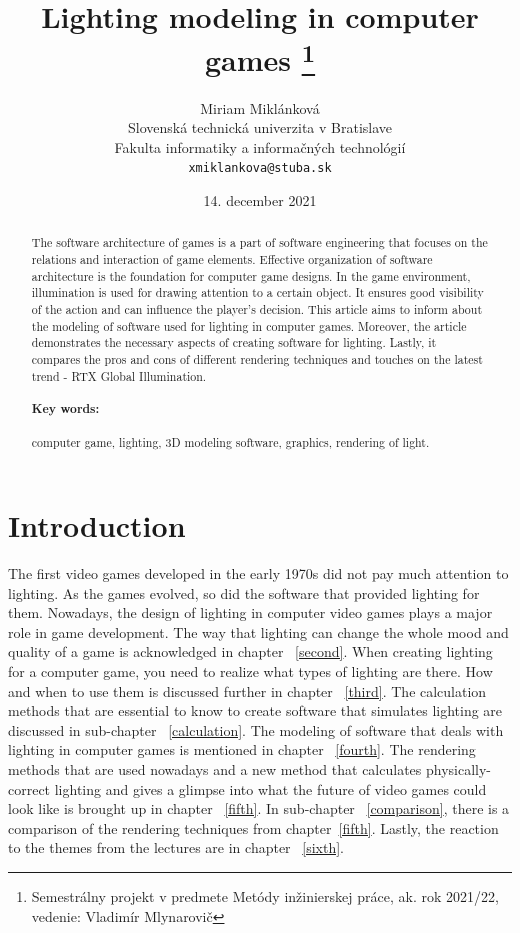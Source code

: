 \documentclass[10pt,twoside,english,a4paper]{article}
\title{Lighting modeling in computer games
\thanks{Semestrálny projekt v predmete Metódy inžinierskej práce, ak. rok 2021/22, vedenie: Vladimír Mlynarovič}}
\author{Miriam Miklánková\\[2pt]
	{\small Slovenská technická univerzita v Bratislave}\\
	{\small Fakulta informatiky a informačných technológií}\\
	{\small \texttt{xmiklankova@stuba.sk}}
	}
\date{\small 14. december 2021}
\begin{document}
\maketitle

\begin{abstract}
The software architecture of games is a part of software engineering that focuses on the relations and interaction of game elements. Effective organization of software architecture is the foundation for computer game designs. In the game environment, illumination is used for drawing attention to a certain object. It ensures good visibility of the action and can influence the player's decision. This article aims to inform about the modeling of software used for lighting in computer games. Moreover, the article demonstrates the necessary aspects of creating software for lighting. Lastly, it compares the pros and cons of different rendering techniques and touches on the latest trend - RTX Global Illumination.

\paragraph{Key words:}
computer game, lighting, 3D modeling software, graphics, rendering of light.

\end{abstract}


\section{Introduction}
The first video games developed in the early 1970s did not pay much attention to lighting. As the games evolved, so did the software that provided lighting for them. Nowadays, the design of lighting in computer video games plays a major role in game development. The way that lighting can change the whole mood and quality of a game is acknowledged in chapter ~\ref{second}. When creating lighting for a computer game, you need to realize what types of lighting are there. How and when to use them is discussed further in chapter ~\ref{third}. The calculation methods that are essential to know to create software that simulates lighting are discussed in sub-chapter ~\ref{calculation}. The modeling of software that deals with lighting in computer games is mentioned in chapter ~\ref{fourth}. The rendering methods that are used nowadays and a new method that calculates physically-correct lighting and gives a glimpse into what the future of video games could look like \cite{Foundry-Article} is brought up in chapter ~\ref{fifth}. In sub-chapter ~\ref{comparison}, there is a comparison of the rendering techniques from chapter~\ref{fifth}. Lastly, the reaction to the themes from the lectures are in chapter ~\ref{sixth}.  
\end{document}
